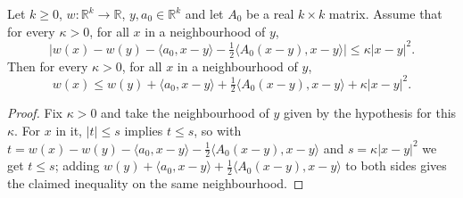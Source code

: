 \begin{lemma}
Let $k\ge0$, $w:\mathbb R^k\to\mathbb R$, $y,a_0\in\mathbb R^k$ and let $A_0$ be a real $k\times k$ matrix. Assume that for every $\kappa>0$, for all $x$ in a neighbourhood of $y$,
\[
\bigl|w(x)-w(y)-\langle a_0,x-y\rangle-\tfrac12\langle A_0(x-y),x-y\rangle\bigr|\le\kappa|x-y|^2 .
\]
Then for every $\kappa>0$, for all $x$ in a neighbourhood of $y$,
\[
w(x)\le w(y)+\langle a_0,x-y\rangle+\tfrac12\langle A_0(x-y),x-y\rangle+\kappa|x-y|^2 .
\]
\end{lemma}
\begin{proof}
Fix $\kappa>0$ and take the neighbourhood of $y$ given by the hypothesis for this $\kappa$. For $x$ in it, $|t|\le s$ implies $t\le s$, so with $t=w(x)-w(y)-\langle a_0,x-y\rangle-\frac12\langle A_0(x-y),x-y\rangle$ and $s=\kappa|x-y|^2$ we get $t\le s$; adding $w(y)+\langle a_0,x-y\rangle+\frac12\langle A_0(x-y),x-y\rangle$ to both sides gives the claimed inequality on the same neighbourhood.
\end{proof}
